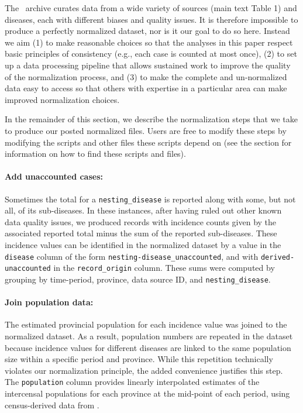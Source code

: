 \documentclass[12pt]{article}
\begin{document}
The \datacronym\ archive curates data from a wide variety of sources (main text Table 1) and diseases, each with different biases and quality issues. It is therefore impossible to produce a perfectly normalized dataset, nor is it our goal to do so here. Instead we aim (1) to make reasonable choices so that the analyses in this paper respect basic principles of consistency (e.g., each case is counted at most once), (2) to set up a data processing pipeline that allows sustained work to improve the quality of the normalization process, and (3) to make the complete and un-normalized data easy to access so that others with expertise in a particular area can make improved normalization choices. 

In the remainder of this section, we describe the normalization steps that we take to produce our posted normalized files. Users are free to modify these steps by modifying the scripts and other files these scripts depend on (see the  section for information on how to find these scripts and files).

\paragraph{Add unaccounted cases:} Sometimes the total for a \texttt{nesting\_disease} is reported along with some, but not all, of its sub-diseases. In these instances, after having ruled out other known data quality issues, we produced records with incidence counts given by the associated reported total minus the sum of the reported sub-diseases. These incidence values can be identified in the normalized dataset by a value in the \texttt{disease} column of the form \texttt{nesting-disease\_unaccounted}, and with \texttt{derived-unaccounted} in the \texttt{record\_origin} column. These sums were computed by grouping by time-period, province, data source ID, and \texttt{nesting\_disease}.

\paragraph{Join population data:} The estimated provincial population for each incidence value was joined to the normalized dataset. As a result, population numbers are repeated in the dataset because incidence values for different diseases are linked to the same population size within a specific period and province. While this repetition technically violates our normalization principle, the added convenience justifies this step. The \texttt{population} column provides linearly interpolated estimates of the intercensal populations for each province at the mid-point of each period, using census-derived data from \cite{canada1925sixth,statistics1973population,statcan2021population}.
\end{document}
